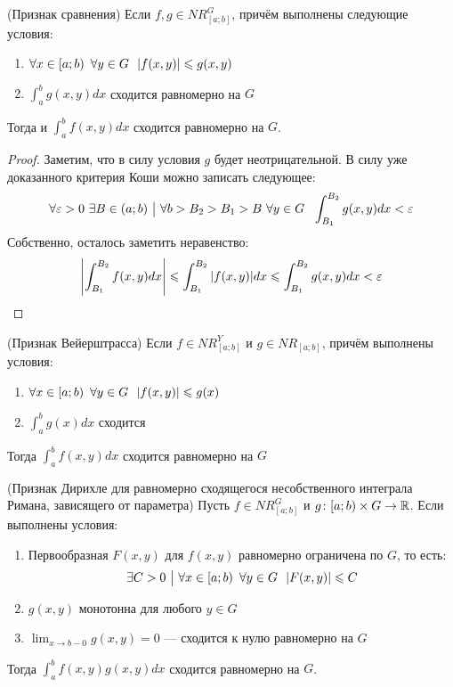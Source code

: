 \begin{theorem} (Признак сравнения)
	Если $f, g \in NR_{[a; b]}^G$, причём выполнены следующие условия:
	\begin{enumerate}
		\item $\forall x \in \left[a; b\right)\ \forall y \in G\ \ |f(x, y)| \leqslant g(x, y)$
		
		\item $\int_a^b g(x, y)dx$ сходится равномерно на $G$
	\end{enumerate}
	Тогда и $\int_a^b f(x, y)dx$ сходится равномерно на $G$.
\end{theorem}

\begin{proof}
	Заметим, что в силу условия $g$ будет неотрицательной. В силу уже доказанного критерия Коши можно записать следующее:
	\[
		\forall \eps > 0\ \exists B \in (a; b) \such \forall b > B_2 > B_1 > B\ \forall y \in G\ \ \int_{B_1}^{B_2} g(x, y)dx < \eps
	\]
	Собственно, осталось заметить неравенство:
	\[
		\left|\int_{B_1}^{B_2} f(x, y)dx\right| \leqslant \int_{B_1}^{B_2} |f(x, y)|dx \leqslant \int_{B_1}^{B_2} g(x, y)dx < \varepsilon
	\]
\end{proof}

\begin{corollary} (Признак Вейерштрасса)
	Если $f \in NR_{[a; b]}^Y$ и $g \in NR_{[a; b]}$, причём выполнены условия:
	\begin{enumerate}
		\item $\forall x \in \left[a; b\right)\ \forall y \in G\ \ |f(x, y)| \leqslant g(x)$
		
		\item $\int_a^b g(x)dx$ сходится
	\end{enumerate}
	Тогда $\int_a^b f(x, y)dx$ сходится равномерно на $G$
\end{corollary}

\begin{theorem} (Признак Дирихле для равномерно сходящегося несобственного интеграла Римана, зависящего от параметра)
	Пусть $f \in NR_{[a; b]}^G$ и $g \colon [a; b) \times G \to \mathbb{R}$. Если выполнены условия:
	\begin{enumerate}
		\item Первообразная $F(x, y)$ для $f(x, y)$ равномерно ограничена по $G$, то есть:
		\[
			\exists C > 0 \ \big|\  \forall x \in \left[a; b\right)\ \forall y \in G\ \ |F(x, y)| \leqslant C
		\]
	
		\item $g(x, y)$ монотонна для любого $y \in G$
		
		\item $\lim_{x \to b-0} g(x, y) = 0$ --- сходится к нулю равномерно на $G$
	\end{enumerate}
	Тогда $\int_a^b f(x, y)g(x, y)dx$ сходится равномерно на $G$.
\end{theorem}

